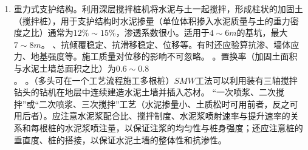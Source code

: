 \documentclass{book}
\begin{document}
\begin{enumerate}
          ，常用简化计算方法---相当梁法。将土压力简化为线性分布，则板桩有反弯点\footnote{反弯点上方的部分即相当梁。}，简化取反弯点在土压力零点\footnote{桩前后被动、主动土压力在该点相等。该简化可避免求支承力。由于线性，相当梁上桩前后土的合力也相等，反弯点剪力与支承力平衡。}，再根据桩前后土压力求出反弯点下另一个弯矩零点。两零点之间的长度需要乘以$1.2$以修正，与反弯点入土深度相加得到板桩入土深度；在两零点之间剪力为零处\footnote{由于线性，为中点。}求得最大弯矩。
          ，它引起的被动土楔滑移线和板桩位移引起的主动土楔滑移线不能相交。\footnote{主动、被动土楔滑移线与受力（主动为重力）方向成$(90\degree-\varphi)/2$角斜向外，静止土楔滑移线与受力方向成$90\degree-\varphi$角斜向外。注意计算嵌固板桩时，板桩位移引起的被动土楔滑移线以反弯点为起点。}
          \footnote{支护板桩上部的横梁，起连接固定作用。}可用型钢或现浇混凝土结构，前者按简支梁计算，后者按连续梁计算。
          、混凝土板桩采用打入法。灌注桩和地下连续墙采用就地成孔（槽）现浇的方法。板桩施工要正确选择打桩方法、打桩机械和流水段划分，以保证刚度和防水性，且墙面要平直，封闭式板桩墙还要封闭合拢。
          \footnote{一角开始逐块插打，每块不停顿，打设快，但易向一边倾斜不易纠正，墙体平直度难控制，一般长度小于$10m$。}、围檩插桩法\footnote{用围檩支架作板桩打设导向装置。分单面围檩和双面围檩。可以保证尺寸准确和钢板桩垂直，但施工速度慢。}、分段复打法\footnote{一定数目钢板桩沿单层围檩插入土中从两端开始依次打入，打好后电焊固定在围檩上，最终形成屏风墙。桩锤重量一般为钢板桩2倍，不能过宽。}。
          ，需正确选取方法和顺序，并应注浆填充。
    \item 重力式支护结构。利用深层搅拌桩机将水泥与土一起搅拌，形成柱状的加固土（搅拌桩），用于支护结构时水泥掺量（单位体积掺入水泥质量与土的重力密度之比）通常为$12\%\sim15\%$，渗透系数很小。适用于$4\sim6m$的基坑，最大$7\sim8m$。
          、抗倾覆稳定、抗滑移稳定、位移等。有时还应验算抗渗、墙体应力、地基强度等。施工质量对位移的影响不可忽略。
          。置换率（加固土面积与水泥土墙总面积之比）为$0.6\sim0.8$。
          。（多头可在一个工艺流程施工多根桩）$SMW$工法可以利用装有三轴搅拌钻头的钻机在地层中连续建造水泥土墙并插入芯材。
          “一次喷浆、二次搅拌”或“二次喷浆、三次搅拌”工艺（水泥掺量小、土质松时可用前者，反之可用后者）。应注意水泥浆配合比、搅拌制度、水泥浆喷射速率与提升速率的关系和每根桩的水泥浆喷注量，以保证注浆的均匀性与桩身强度；还应注意桩的垂直度、桩的搭接，以保证水泥土墙的整体性和抗渗性。
\end{enumerate}
\end{document}
